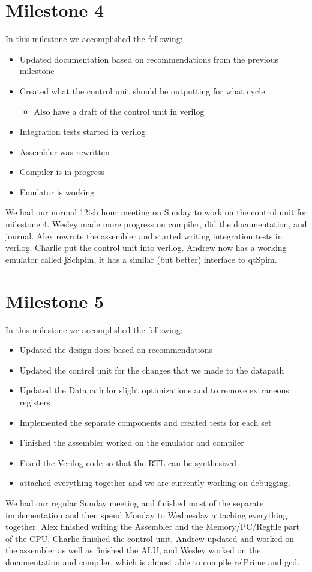 \documentclass{report}
\begin{document}
	\section{Milestone 4}
		In this milestone we accomplished the following:
		\begin{itemize}
			\item Updated documentation based on recommendations from the previous milestone
			\item Created what the control unit should be outputting for what cycle
			\begin{itemize}
				\item Also have a draft of the control unit in verilog
			\end{itemize}
			\item Integration tests started in verilog
			\item Assembler was rewritten
			\item Compiler is in progress
			\item Emulator is working
		\end{itemize}
		We had our normal 12ish hour meeting on Sunday to work on the control unit for milestone 4.  Wesley made more progress on compiler, did the documentation, and journal.  Alex rewrote the assembler and started writing integration tests in verilog.  Charlie put the control unit into verilog. Andrew now has a working emulator called jSchpim, it has a similar (but better) interface to qtSpim.
	\section{Milestone 5}
		In this milestone we accomplished the following:
		\begin{itemize}
			\item Updated the design docs based on recommendations
			\item Updated the control unit for the changes that we made to the datapath
			\item Updated the Datapath for slight optimizations and to remove extraneous registers
			\item Implemented the separate components and created tests for each set
			\item Finished the assembler worked on the emulator and compiler
			\item Fixed the Verilog code so that the RTL can be synthesized
			\item attached everything together and we are currently working on debugging.
		\end{itemize}
		We had our regular Sunday meeting and finished most of the separate implementation and then spend Monday to Wednesday attaching everything together. Alex finished writing the Assembler and the Memory/PC/Regfile part of the CPU, Charlie finished the control unit, Andrew updated and worked on the assembler as well as finished the ALU, and Wesley worked on the documentation and compiler, which is almost able to compile relPrime and gcd.
\end{document}
